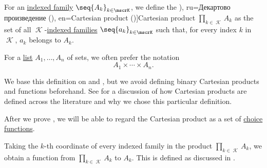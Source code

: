 \begin{definition}\label{def:cartesian_product}\mimprovised
  For an \hyperref[def:indexed_family]{indexed family} \( \seq{ A_k }_{k \in \mscrK} \), we define the \term[bg=Декартово произведение (\cite[367]{ГеновМиховскиМоллов1991Алгебра}), ru=Декартово произведение (\cite[11]{Архангельский1988Множества}), en=Cartesian product (\cite[36]{Halmos1960Sets})]{Cartesian product} \( \prod_{k \in \mscrK} A_k \) as the set of all \( \mscrK \)-\hyperref[def:indexed_family]{indexed families} \( \seq{ a_k }_{k \in \mscrK} \) such that, for every index \( k \) in \( \mscrK \), \( a_k \) belongs to \( A_k \).

  For a \hyperref[def:ordered_tuple]{list} \( A_1, \ldots, A_n \) of sets, we often prefer the notation
  \begin{equation*}
    A_1 \times \cdots \times A_n.
  \end{equation*}
\end{definition}
\begin{comments}
  \item We base this definition on \cite[36]{Halmos1960Sets} and \cite[11]{Архангельский1988Множества}, but we avoid defining binary Cartesian products and functions beforehand. See  for a discussion of how Cartesian products are defined across the literature and why we chose this particular definition.

  \item After we prove , we will be able to regard the Cartesian product as a set of \hyperref[def:choice_function]{choice functions}.

  \item Taking the \( k \)-th coordinate of every indexed family in the product \( \prod_{k \in \mscrK} A_k \), we obtain a function from \( \prod_{k \in \mscrK} A_k \) to \( A_k \). This is defined as discussed in .
\end{comments}

